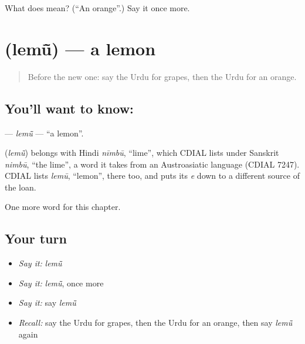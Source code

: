 \begin{tcolorbox}[breakable,colback=teal!4,colframe=teal!35!black,title={Before you move on}]
What does  mean? (\textquotedblleft{}An orange\textquotedblright{}.) Say it once more.
\end{tcolorbox}
\section[\texorpdfstring{\ur{لیموں} (lemū̃)}{لیموں (lemū̃)}]{ (lemū̃) — a lemon}

\label{lesson:UR-C57-lemu}



\begin{quote}
Before the new one: say the Urdu for grapes, then the Urdu for an orange.
\end{quote}

\subsection*{You'll want to know: }
\textbf{} — \emph{lemū̃} — \textquotedblleft{}a lemon\textquotedblright{}.

\begin{cousinweb}
\textbf{} (\emph{lemū̃}) belongs with Hindi \emph{nīmbū}, \textquotedblleft{}lime\textquotedblright{}, which CDIAL lists under Sanskrit \emph{nimbū}, \textquotedblleft{}the lime\textquotedblright{}, a word it takes from an Austroasiatic language (CDIAL 7247). CDIAL lists \emph{lemū}, \textquotedblleft{}lemon\textquotedblright{}, there too, and puts its \emph{e} down to a different source of the loan.
\end{cousinweb}

\begin{grammarlens}[title={What you've built}]
One more word for this chapter.
\end{grammarlens}

\subsection*{Your turn}
\begin{itemize}
\raggedright
  \item \emph{Say it:} \emph{lemū̃}
  \item \emph{Say it:} \emph{lemū̃}, once more
  \item \emph{Say it:} say \emph{lemū̃}
  \item \emph{Recall:} say the Urdu for grapes, then the Urdu for an orange, then say \emph{lemū̃} again
\end{itemize}

